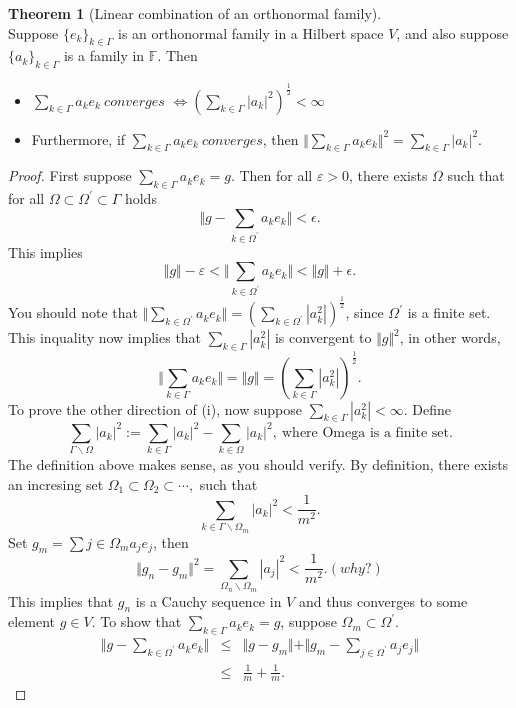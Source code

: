 \documentclass[12pt]{book}
\theoremstyle{definition}
\newtheorem{theorem}{Theorem}[chapter]
\newcommand{\F}{\mathbb{F}}
\begin{document}
\begin{theorem}[Linear combination of an orthonormal family] \ \\
Suppose $\{e_k\}_{k \in \Gamma}$ is an orthonormal family in a Hilbert space $V$, and also suppose $\{a_k\}_{k \in \Gamma}$ is a family in $\F$. Then
\begin{itemize}
	\item $\sum_{k \in \Gamma}a_ke_k \ converges$ $\iff (\sum_{k \in \Gamma}|a_k|^2)^{\frac{1}{2}}<\infty$ 
	\item Furthermore, if $\sum_{k \in \Gamma}a_ke_k \ converges$, then $\Vert \sum_{k \in \Gamma}a_ke_k\Vert^2=\sum_{k \in \Gamma}|a_k|^2$.
\end{itemize} 
\end{theorem}
\begin{proof}
First suppose $\sum_{k \in \Gamma}a_ke_k=g$. Then for all $\varepsilon > 0$, there exists $\Omega$ such that for all $\Omega \subset \Omega^\prime\subset \Gamma$ holds
$$
\Vert g - \sum_{k\in \Omega^\prime}a_ke_k\Vert < \epsilon.
$$
This implies 
$$
\Vert g \Vert - \varepsilon < \Vert \sum_{k \in \Omega^\prime}a_ke_k\Vert < \Vert g\Vert + \epsilon.
$$
You should note that $\Vert \sum_{k \in \Omega^\prime}a_ke_k\Vert=(\sum_{k\in \Omega^\prime}|a_k^2|)^{\frac{1}{2}}$, since $\Omega^\prime$ is a finite set. This inquality now implies that $\sum_{k\in \Gamma}|a_k^2|$ is convergent to $\Vert g \Vert^2$, in other words,
$$
\Vert \sum_{k \in \Gamma} a_ke_k \Vert = \Vert g\Vert= (\sum_{k\in \Gamma}|a_k^2|)^\frac{1}{2}.
$$
To prove the other direction of (i), now suppose $\sum_{k\in \Gamma}|a_k^2|<\infty$. Define
$$
\sum_{\Gamma \backslash \Omega}|a_k|^2 := \sum_{k \in \Gamma}|a_k|^2 - \sum_{k \in \Omega}|a_k|^2, \ \text{where Omega is a finite set.}
$$
The definition above makes sense, as you should verify. By definition, there exists an incresing set $\Omega_1\subset \Omega_2 \subset \cdots,$ such that 
$$
\sum_{k \in \Gamma \backslash \Omega_m} |a_k|^2 < \frac{1}{m^2}.
$$
Set $g_m = \sum{j\in \Omega_m}a_je_j$, then
$$
\Vert g_n -g_m \Vert ^2 = \sum_{\Omega_n \backslash \Omega_m}|a_j|^2<\frac{1}{m^2}.(why?)
$$
This implies that $g_n$ is a Cauchy sequence in $V$ and thus converges to some element $g \in V$. To show that $\sum_{k \in \Gamma}a_ke_k=g$, suppose $\Omega_m \subset \Omega^\prime $.
\begin{eqnarray*}
	\Vert g - \sum_{k \in \Omega^\prime}a_ke_k\Vert &\leq& \Vert g-g_m\Vert + \Vert g_m-\sum_{j \in \Omega^\prime}a_je_j \Vert \\
	&\leq & \frac{1}{m} + \frac{1}{m}.
\end{eqnarray*}
\end{proof}
\end{document}
